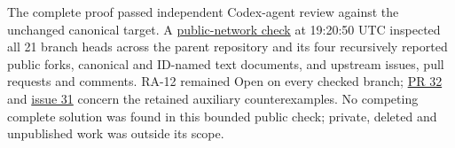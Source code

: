 \documentclass[11pt,a4paper]{article}
\begin{document}
The complete proof passed independent Codex-agent review against the
unchanged canonical target. A
\href{https://github.com/ajt60gaibb/OpenProblemsInNLA/blob/main/references/stepaniants-ra12-2026-09-11/verification/network-check-latest.json}{public-network
check} at 19:20:50 UTC inspected all 21 branch heads across the parent
repository and its four recursively reported public forks, canonical and
ID-named text documents, and upstream issues, pull requests and
comments. RA-12 remained Open on every checked branch;
\href{https://github.com/ajt60gaibb/OpenProblemsInNLA/pull/32}{PR 32}
and
\href{https://github.com/ajt60gaibb/OpenProblemsInNLA/issues/31}{issue
31} concern the retained auxiliary counterexamples. No competing
complete solution was found in this bounded public check; private,
deleted and unpublished work was outside its scope.
\end{document}
